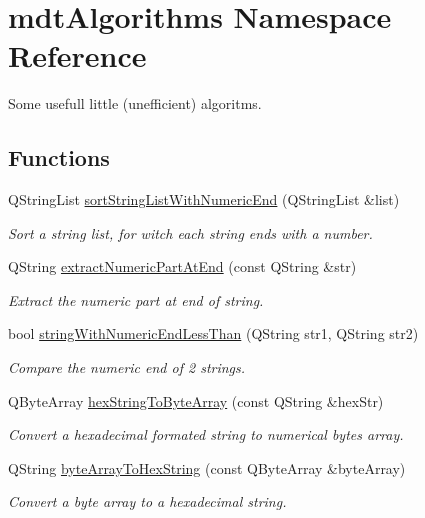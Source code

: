 \hypertarget{namespacemdt_algorithms}{
\section{mdtAlgorithms Namespace Reference}
\label{namespacemdt_algorithms}
}


Some usefull little (unefficient) algoritms.  


\subsection*{Functions}
\begin{DoxyCompactItemize}
\item 
QStringList \hyperlink{namespacemdt_algorithms_a1a3e54a0c5c508c2ea531c7c6200588e}{sortStringListWithNumericEnd} (QStringList \&list)
\begin{DoxyCompactList}\small\item\em Sort a string list, for witch each string ends with a number. \end{DoxyCompactList}\item 
QString \hyperlink{namespacemdt_algorithms_adfeb44a0a2a440a6b200ad19db73ac45}{extractNumericPartAtEnd} (const QString \&str)
\begin{DoxyCompactList}\small\item\em Extract the numeric part at end of string. \end{DoxyCompactList}\item 
bool \hyperlink{namespacemdt_algorithms_a11d5a1ebe9a68710e6e78f768ac9203c}{stringWithNumericEndLessThan} (QString str1, QString str2)
\begin{DoxyCompactList}\small\item\em Compare the numeric end of 2 strings. \end{DoxyCompactList}\item 
QByteArray \hyperlink{namespacemdt_algorithms_a5094251abb1557b9b4717b3a0f1a8535}{hexStringToByteArray} (const QString \&hexStr)
\begin{DoxyCompactList}\small\item\em Convert a hexadecimal formated string to numerical bytes array. \end{DoxyCompactList}\item 
QString \hyperlink{namespacemdt_algorithms_a29977b36180db7518a7ee2317265d26b}{byteArrayToHexString} (const QByteArray \&byteArray)
\begin{DoxyCompactList}\small\item\em Convert a byte array to a hexadecimal string. \end{DoxyCompactList}\item 

\end{DoxyCompactItemize}
